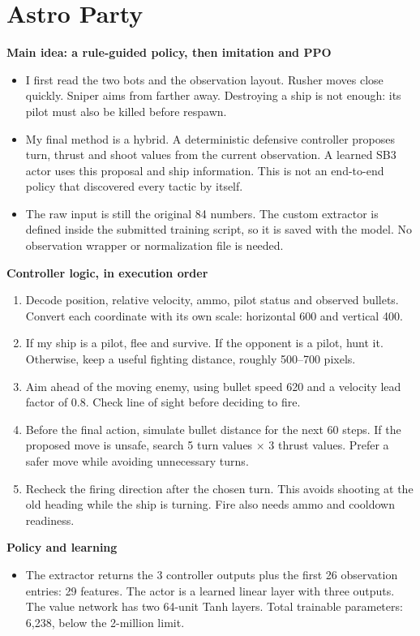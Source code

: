 \documentclass[a4paper]{article}
\begin{document}
\section{Astro Party}
\begin{answer}
\textbf{Main idea: a rule-guided policy, then imitation and PPO}
\begin{itemize}
\item I first read the two bots and the observation layout. Rusher moves close quickly. Sniper aims from farther away. Destroying a ship is not enough: its pilot must also be killed before respawn.
\item My final method is a hybrid. A deterministic defensive controller proposes turn, thrust and shoot values from the current observation. A learned SB3 actor uses this proposal and ship information. This is not an end-to-end policy that discovered every tactic by itself.
\item The raw input is still the original 84 numbers. The custom extractor is defined inside the submitted training script, so it is saved with the model. No observation wrapper or normalization file is needed.
\end{itemize}
\textbf{Controller logic, in execution order}
\begin{enumerate}
\item Decode position, relative velocity, ammo, pilot status and observed bullets. Convert each coordinate with its own scale: horizontal 600 and vertical 400.
\item If my ship is a pilot, flee and survive. If the opponent is a pilot, hunt it. Otherwise, keep a useful fighting distance, roughly 500--700 pixels.
\item Aim ahead of the moving enemy, using bullet speed 620 and a velocity lead factor of 0.8. Check line of sight before deciding to fire.
\item Before the final action, simulate bullet distance for the next 60 steps. If the proposed move is unsafe, search 5 turn values $\times$ 3 thrust values. Prefer a safer move while avoiding unnecessary turns.
\item Recheck the firing direction after the chosen turn. This avoids shooting at the old heading while the ship is turning. Fire also needs ammo and cooldown readiness.
\end{enumerate}
\textbf{Policy and learning}
\begin{itemize}
\item The extractor returns the 3 controller outputs plus the first 26 observation entries: 29 features. The actor is a learned linear layer with three outputs. The value network has two 64-unit Tanh layers. Total trainable parameters: 6,238, below the 2-million limit.

\end{itemize}
\end{answer}
\end{document}

